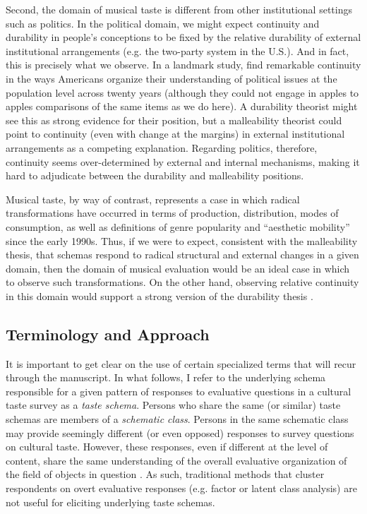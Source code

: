 \documentclass[preprint, authoryear,11pt, 3p]{elsarticle}
\begin{document}
Second, the domain of musical taste is different from other institutional settings such as politics. In the political domain, we might expect continuity and durability in people's conceptions to be fixed by the relative durability of external institutional arrangements (e.g. the two-party system in the U.S.). And in fact, this is precisely what we observe. In a landmark study, \citet{baldassarri2014neither} find remarkable continuity in the ways Americans organize their understanding of political issues at the population level across twenty years (although they could not engage in apples to apples comparisons of the same items as we do here). A durability theorist might see this as strong evidence for their position, but a malleability theorist could point to continuity (even with change at the margins) in external institutional arrangements as a competing explanation. Regarding politics, therefore, continuity seems over-determined by external and internal mechanisms, making it hard to adjudicate between the durability and malleability positions. 

Musical taste, by way of contrast, represents a case in which radical transformations have occurred in terms of production, distribution, modes of consumption, as well as definitions of genre popularity and ``aesthetic mobility'' \citep{baumann2001intellectualization} since the early 1990s. Thus, if we were to expect, consistent with the malleability thesis, that schemas respond to radical structural and external changes in a given domain, then the domain of musical evaluation would be an ideal case in which to observe such transformations. On the other hand, observing relative continuity in this domain would support a strong version of the durability thesis \citep{vaisey2016cultural}. 

\subsection{Terminology and Approach}
It is important to get clear on the use of certain specialized terms that will recur through the manuscript. In what follows, I refer to the underlying schema responsible for a given pattern of responses to evaluative questions in a cultural taste survey as a \emph{taste schema}. Persons who share the same (or similar) taste schemas are members of a \emph{schematic class}. Persons in the same schematic class may provide seemingly different (or even opposed) responses to survey questions on cultural taste. However, these responses, even if different at the level of content, share the same understanding of the overall evaluative organization of the field of objects in question \citep{goldberg2011mapping}. As such, traditional methods that cluster respondents on overt evaluative responses (e.g. factor or latent class analysis) are not useful for eliciting underlying taste schemas.
\end{document}
